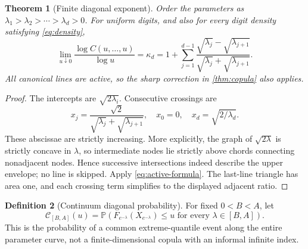 \documentclass[11pt,a4paper]{article}
\newtheorem{theorem}{Theorem}[section]
\theoremstyle{definition}
\newtheorem{definition}[theorem]{Definition}
\theoremstyle{remark}
\newcommand{\PP}{\mathbb P}
\numberwithin{equation}{section}
\begin{document}
\begin{theorem}[Finite diagonal exponent]
\label{thm:finite-d}
Order the parameters as
$\lambda_1>\lambda_2>\cdots>\lambda_d>0$. For uniform digits, and also
for every digit density satisfying \eqref{eq:density},
\begin{equation}
 \lim_{u\downarrow0}
 \frac{\log C(u,\ldots,u)}{\log u}
 =\kappa_d
 =1+\sum_{j=1}^{d-1}
 \frac{\sqrt{\lambda_j}-\sqrt{\lambda_{j+1}}}
      {\sqrt{\lambda_j}+\sqrt{\lambda_{j+1}}}.
 \label{eq:kappa-d}
\end{equation}
All canonical lines are active, so the sharp correction in
\cref{thm:copula} also applies.
\end{theorem}
\begin{proof}
The intercepts are $\sqrt{2\lambda_i}$. Consecutive crossings are
\[
 x_j=\frac{\sqrt2}{\sqrt{\lambda_j}+\sqrt{\lambda_{j+1}}},
 \quad x_0=0,\quad x_d=\sqrt{2/\lambda_d}.
\]
These abscissae are strictly increasing. More explicitly, the graph of
$\sqrt{2\lambda}$ is strictly concave in $\lambda$, so intermediate
nodes lie strictly above chords connecting nonadjacent nodes. Hence
successive intersections indeed describe the upper envelope; no line is
skipped. Apply \eqref{eq:active-formula}. The last-line triangle has area
one, and each crossing term simplifies to the displayed adjacent ratio.
\end{proof}

\begin{definition}[Continuum diagonal probability]
For fixed $0<B<A$, let
\begin{equation}
 \mathcal C_{[B,A]}(u)=
 \PP\left(F_{e^{-\lambda}}(X_{e^{-\lambda}})\le u
                     \text{ for every }\lambda\in[B,A]\right).
 \label{eq:continuum-C}
\end{equation}
This is the probability of a common extreme-quantile event along the
entire parameter curve, not a finite-dimensional copula with an informal
infinite index.
\end{definition}
\end{document}
